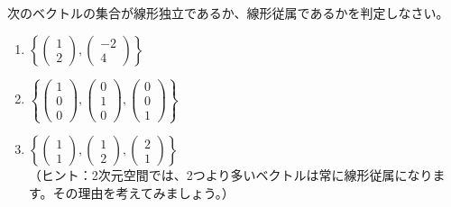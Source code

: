 \begin{quiz}
次のベクトルの集合が線形独立であるか、線形従属であるかを判定しなさい。
\begin{enumerate}
\item $\left\{ \begin{pmatrix} 1 \\ 2 \end{pmatrix}, \begin{pmatrix} -2 \\ 4 \end{pmatrix} \right\}$
\item $\left\{ \begin{pmatrix} 1 \\ 0 \\ 0 \end{pmatrix}, \begin{pmatrix} 0 \\ 1 \\ 0 \end{pmatrix}, \begin{pmatrix} 0 \\ 0 \\ 1 \end{pmatrix} \right\}$
\item $\left\{ \begin{pmatrix} 1 \\ 1 \end{pmatrix}, \begin{pmatrix} 1 \\ 2 \end{pmatrix}, \begin{pmatrix} 2 \\ 1 \end{pmatrix} \right\}$\\
（ヒント：2次元空間では、2つより多いベクトルは常に線形従属になります。その理由を考えてみましょう。）
\end{enumerate}
\end{quiz}